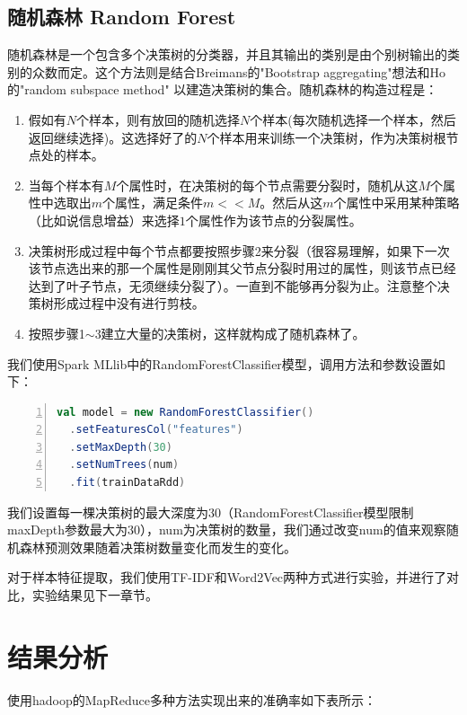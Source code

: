 \documentclass[lang=cn,11pt]{elegantpaper}
\begin{document}
\subsection{随机森林 Random Forest}
随机森林是一个包含多个决策树的分类器，并且其输出的类别是由个别树输出的类别的众数而定。这个方法则是结合Breimans的"Bootstrap aggregating"想法和Ho的"random subspace method" 以建造决策树的集合。随机森林的构造过程是：
\begin{enumerate}[1.]
  \item 假如有$N$个样本，则有放回的随机选择$N$个样本(每次随机选择一个样本，然后返回继续选择)。这选择好了的$N$个样本用来训练一个决策树，作为决策树根节点处的样本。
  \item 当每个样本有$M$个属性时，在决策树的每个节点需要分裂时，随机从这$M$个属性中选取出$m$个属性，满足条件$m << M$。然后从这$m$个属性中采用某种策略（比如说信息增益）来选择$1$个属性作为该节点的分裂属性。
  \item 决策树形成过程中每个节点都要按照步骤2来分裂（很容易理解，如果下一次该节点选出来的那一个属性是刚刚其父节点分裂时用过的属性，则该节点已经达到了叶子节点，无须继续分裂了）。一直到不能够再分裂为止。注意整个决策树形成过程中没有进行剪枝。
  \item 按照步骤1$\sim$3建立大量的决策树，这样就构成了随机森林了。
\end{enumerate}\par
我们使用Spark MLlib中的RandomForestClassifier模型，调用方法和参数设置如下：
\begin{lstlisting}[language={Scala},numbers=left,numberstyle=\tiny,%frame=shadowbox,  
  rulesepcolor=\color{red!20!green!20!blue!20},  
  keywordstyle=\color{blue!70!black},  
  commentstyle=\color{blue!90!},  
  basicstyle=\ttfamily]
  val model = new RandomForestClassifier()
  .setFeaturesCol("features")
  .setMaxDepth(30)
  .setNumTrees(num)
  .fit(trainDataRdd)
\end{lstlisting}\par
我们设置每一棵决策树的最大深度为30（RandomForestClassifier模型限制maxDepth参数最大为30），num为决策树的数量，我们通过改变num的值来观察随机森林预测效果随着决策树数量变化而发生的变化。\par
对于样本特征提取，我们使用TF-IDF和Word2Vec两种方式进行实验，并进行了对比，实验结果见下一章节。
\section{结果分析}
使用hadoop的MapReduce多种方法实现出来的准确率如下表所示：
\end{document}
